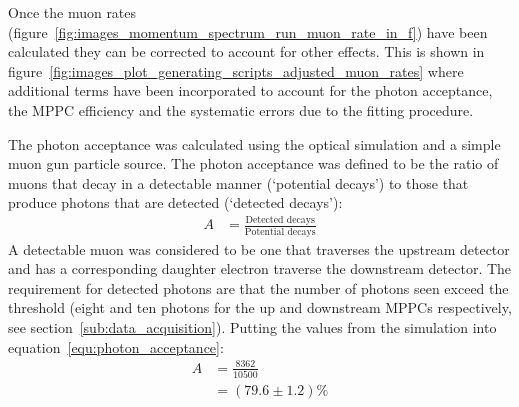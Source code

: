 

\clearpage
Once the muon rates (figure~\ref{fig:images_momentum_spectrum_run_muon_rate_in_f}) have been calculated they can be corrected to account for other effects. This is shown in figure~\ref{fig:images_plot_generating_scripts_adjusted_muon_rates} where additional terms have been incorporated to account for the photon acceptance, the MPPC efficiency and the systematic errors due to the fitting procedure. 

The photon acceptance was calculated using the optical simulation and a simple muon gun particle source. The photon acceptance was defined to be the ratio of muons that decay in a detectable manner (`potential decays') to those that produce photons that are detected (`detected decays'):
\begin{align}
  A &= \frac{\text{Detected decays}}{\text{Potential decays}} \label{equ:photon_acceptance}
\end{align}
A detectable muon was considered to be one that traverses the upstream detector and has a corresponding daughter electron traverse the downstream detector. The requirement for detected photons are that the number of photons seen exceed the threshold (eight and ten photons for the up and downstream MPPCs respectively, see section~\ref{sub:data_acquisition}). Putting the values from the simulation into equation~\eqref{equ:photon_acceptance}:
\begin{align}
  A &= \frac{8362}{10500} \\
    &= (79.6\pm1.2)\%
\end{align}

